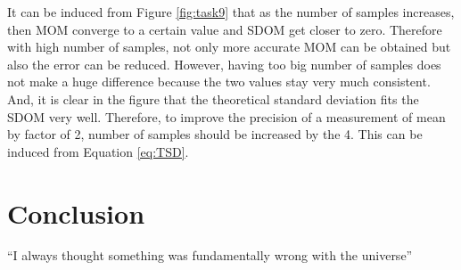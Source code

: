 \documentclass[a4paper,12pt]{article}
\begin{document}
It can be induced from Figure \ref{fig:task9} that as the number of samples increases, then MOM converge to a certain value and SDOM get closer to zero. Therefore with high number of samples, not only more accurate MOM can be obtained but also the error can be reduced. However, having too big number of samples does not make a huge difference because the two values stay very much consistent. And, it is clear in the figure that the theoretical standard deviation fits the SDOM very well. Therefore, to improve the precision of a measurement of mean by factor of 2, number of samples should be increased by the 4. This can be induced from Equation \ref {eq:TSD}. 

\section{Conclusion}
``I always thought something was fundamentally wrong with the universe'' \citep{adams1995hitchhiker}



\end{document}
